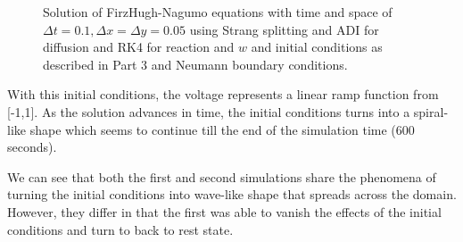 \begin{figure}[!tbh]
 
   
  \caption{Solution of FirzHugh-Nagumo equations with time and space of $\Delta t=0.1, \Delta x = \Delta y=0.05$ using Strang splitting and ADI for diffusion and RK4 for reaction and $w$ and initial conditions as described in Part 3 and Neumann boundary conditions.}
   \label{fig:sol3}
\end{figure} 

With this initial conditions, the voltage represents a linear ramp function from [-1,1]. As the solution advances in time, the initial conditions turns into a spiral-like shape which seems to continue till the end of the simulation time (600 seconds). 

We can see that both the first and second simulations share the phenomena of turning the initial conditions into wave-like shape that spreads across the domain. However, they differ in that the first was able to vanish the effects of the initial conditions and turn to back to rest state. 

